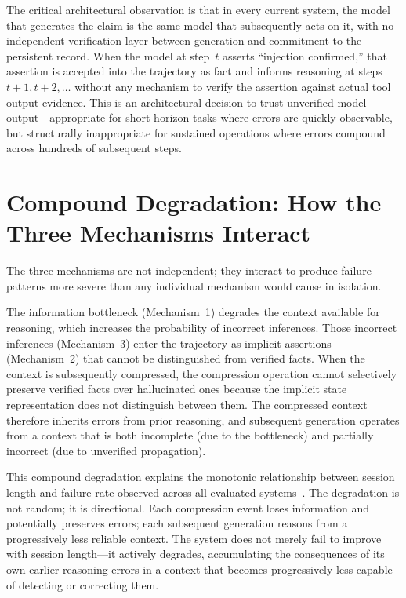 \documentclass[12pt,a4paper,oneside,openany]{book}
\begin{document}
The critical architectural observation is that in every current system, the model that generates the claim is the same model that subsequently acts on it, with no independent verification layer between generation and commitment to the persistent record. When the model at step~$t$ asserts ``injection confirmed,'' that assertion is accepted into the trajectory as fact and informs reasoning at steps~$t{+}1, t{+}2, \ldots$ without any mechanism to verify the assertion against actual tool output evidence. This is an architectural decision to trust unverified model output---appropriate for short-horizon tasks where errors are quickly observable, but structurally inappropriate for sustained operations where errors compound across hundreds of subsequent steps.

\section{Compound Degradation: How the Three Mechanisms Interact}

The three mechanisms are not independent; they interact to produce failure patterns more severe than any individual mechanism would cause in isolation.

The information bottleneck (Mechanism~1) degrades the context available for reasoning, which increases the probability of incorrect inferences. Those incorrect inferences (Mechanism~3) enter the trajectory as implicit assertions (Mechanism~2) that cannot be distinguished from verified facts. When the context is subsequently compressed, the compression operation cannot selectively preserve verified facts over hallucinated ones because the implicit state representation does not distinguish between them. The compressed context therefore inherits errors from prior reasoning, and subsequent generation operates from a context that is both incomplete (due to the bottleneck) and partially incorrect (due to unverified propagation).

This compound degradation explains the monotonic relationship between session length and failure rate observed across all evaluated systems~\citep{deng2024pentestgpt,happe2023hackerllm}. The degradation is not random; it is directional. Each compression event loses information and potentially preserves errors; each subsequent generation reasons from a progressively less reliable context. The system does not merely fail to improve with session length---it actively degrades, accumulating the consequences of its own earlier reasoning errors in a context that becomes progressively less capable of detecting or correcting them.
\end{document}
